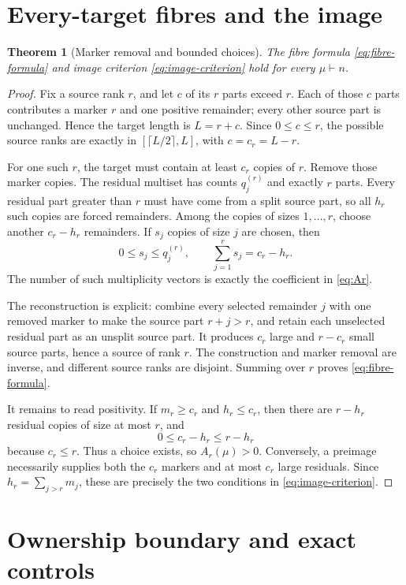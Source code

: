 \documentclass[10pt,a4paper]{amsart}
\newtheorem{theorem}{Theorem}[section]
\theoremstyle{definition}
\theoremstyle{remark}
\begin{document}
\section{Every-target fibres and the image}

\begin{theorem}[Marker removal and bounded choices]\label{thm:fibres}
The fibre formula \eqref{eq:fibre-formula} and image criterion
\eqref{eq:image-criterion} hold for every $\mu\vdash n$.
\end{theorem}

\begin{proof}
Fix a source rank $r$, and let $c$ of its $r$ parts exceed $r$.  Each of
those $c$ parts contributes a marker $r$ and one positive remainder; every
other source part is unchanged.  Hence the target length is $L=r+c$.  Since
$0\leq c\leq r$, the possible source ranks are exactly in
$[\lceil L/2\rceil,L]$, with $c=c_r=L-r$.

For one such $r$, the target must contain at least $c_r$ copies of $r$.
Remove those marker copies.  The residual multiset has counts
$q_j^{(r)}$ and exactly $r$ parts.  Every residual part greater than $r$
must have come from a split source part, so all $h_r$ such copies are forced
remainders.  Among the copies of sizes $1,\ldots,r$, choose another
$c_r-h_r$ remainders.  If $s_j$ copies of size $j$ are chosen, then
\[
 0\leq s_j\leq q_j^{(r)},\qquad
 \sum_{j=1}^{r}s_j=c_r-h_r.
\]
The number of such multiplicity vectors is exactly the coefficient in
\eqref{eq:Ar}.

The reconstruction is explicit: combine every selected remainder $j$ with
one removed marker to make the source part $r+j>r$, and retain each
unselected residual part as an unsplit source part.  It produces $c_r$
large and $r-c_r$ small source parts, hence a source of rank $r$.  The
construction and marker removal are inverse, and different source ranks are
disjoint.  Summing over $r$ proves \eqref{eq:fibre-formula}.

It remains to read positivity.  If $m_r\geq c_r$ and $h_r\leq c_r$, then
there are $r-h_r$ residual copies of size at most $r$, and
\[
                 0\leq c_r-h_r\leq r-h_r
\]
because $c_r\leq r$.  Thus a choice exists, so $A_r(\mu)>0$.  Conversely,
a preimage necessarily supplies both the $c_r$ markers and at most $c_r$
large residuals.  Since $h_r=\sum_{j>r}m_j$, these are precisely the two
conditions in \eqref{eq:image-criterion}.
\end{proof}

\section{Ownership boundary and exact controls}
\end{document}
